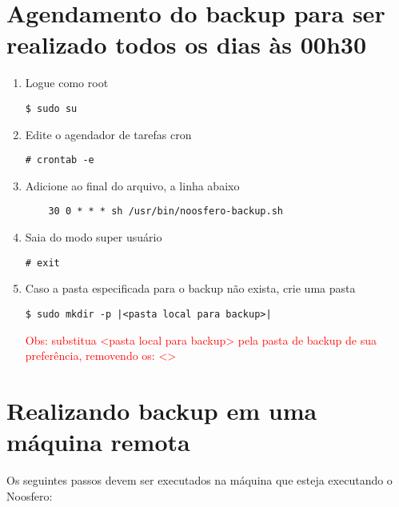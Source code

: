 \section{Agendamento do backup para ser realizado todos os dias às 00h30}

\begin{enumerate}[label=\alph*)]

\item Logue como root
\begin{lstlisting}
$ sudo su
\end{lstlisting}

\item Edite o agendador de tarefas cron
\begin{lstlisting}
# crontab -e
\end{lstlisting}

\item Adicione ao final do arquivo, a linha abaixo
\begin{lstlisting}
	30 0 * * * sh /usr/bin/noosfero-backup.sh
\end{lstlisting}

\item Saia do modo super usuário
\begin{lstlisting}
# exit
\end{lstlisting}

\item Caso a pasta especificada para o backup não exista, crie uma pasta
\begin{lstlisting}[style=base]
$ sudo mkdir -p |<pasta local para backup>|
\end{lstlisting}

\textcolor{red}{{\scriptsize Obs: substitua <pasta local para backup> pela pasta de backup de sua preferência, removendo os: <> }}

\end{enumerate}

\section{Realizando backup em uma máquina remota}

Os seguintes passos devem ser executados na máquina que esteja executando o Noosfero:

